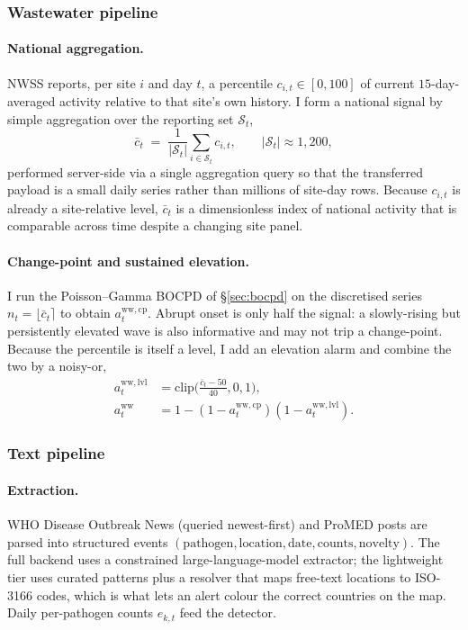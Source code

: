 \documentclass[10pt,twocolumn]{article}
\theoremstyle{definition}
\begin{document}
\subsubsection{Wastewater pipeline}
\label{sec:ww}
\paragraph{National aggregation.}
NWSS reports, per site $i$ and day $t$, a percentile $c_{i,t}\in[0,100]$ of
current $15$-day-averaged activity relative to that site's own history. I form a
national signal by simple aggregation over the reporting set $\mathcal S_t$,
\begin{equation}
\bar c_t \;=\; \frac{1}{|\mathcal S_t|}\sum_{i\in\mathcal S_t} c_{i,t},
\qquad |\mathcal S_t|\approx 1{,}200,
\label{eq:natagg}
\end{equation}
performed server-side via a single aggregation query so that the transferred
payload is a small daily series rather than millions of site-day rows. Because
$c_{i,t}$ is already a site-relative level, $\bar c_t$ is a dimensionless index of
national activity that is comparable across time despite a changing site panel.

\paragraph{Change-point and sustained elevation.}
I run the Poisson--Gamma BOCPD of \S\ref{sec:bocpd} on the discretised series
$n_t=\lfloor\bar c_t\rceil$ to obtain $a^{\mathrm{ww,cp}}_t$. Abrupt onset is only
half the signal: a slowly-rising but persistently elevated wave is also
informative and may not trip a change-point. Because the percentile is itself a
level, I add an elevation alarm and combine the two by a noisy-or,
\begin{align}
a^{\mathrm{ww,lvl}}_t &= \mathrm{clip}\!\Big(\tfrac{\bar c_t-50}{40},0,1\Big), \nonumber\\
a^{\mathrm{ww}}_t &= 1-(1-a^{\mathrm{ww,cp}}_t)(1-a^{\mathrm{ww,lvl}}_t).
\label{eq:ww-alarm}
\end{align}

\subsubsection{Text pipeline}
\label{sec:text}
\paragraph{Extraction.}
WHO Disease Outbreak News (queried newest-first) and ProMED posts are parsed into
structured events $(\text{pathogen},\text{location},\text{date},\text{counts},
\text{novelty})$. The full backend uses a constrained large-language-model
extractor; the lightweight tier uses curated patterns plus a resolver that maps
free-text locations to ISO-3166 codes, which is what lets an alert colour the
correct countries on the map. Daily per-pathogen counts $e_{k,t}$ feed the
detector.
\end{document}
